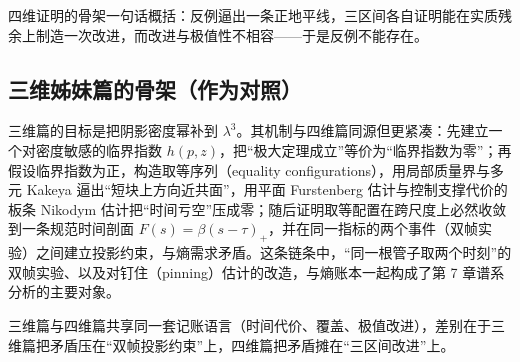 \begin{keybox}[可记忆主句]
四维证明的骨架一句话概括：反例逼出一条正地平线，三区间各自证明能在实质残余上制造一次改进，而改进与极值性不相容——于是反例不能存在。
\end{keybox}

\subsection{三维姊妹篇的骨架（作为对照）}

三维篇的目标是把阴影密度幂补到 $\lambda^{3}$。其机制与四维篇同源但更紧凑：先建立一个对密度敏感的临界指数 $h(p,z)$，把“极大定理成立”等价为“临界指数为零”；再假设临界指数为正，构造取等序列（equality configurations），用局部质量界与多元 Kakeya 逼出“短块上方向近共面”，用平面 Furstenberg 估计与控制支撑代价的板条 Nikodym 估计把“时间亏空”压成零；随后证明取等配置在跨尺度上必然收敛到一条规范时间剖面 $F(s)=\beta(s-\tau)_{+}$，并在同一指标的两个事件（双帧实验）之间建立投影约束，与熵需求矛盾。这条链条中，“同一根管子取两个时刻”的双帧实验、以及对钉住（pinning）估计的改造，与熵账本一起构成了第 7 章谱系分析的主要对象。

\begin{keybox}[可记忆主句]
三维篇与四维篇共享同一套记账语言（时间代价、覆盖、极值改进），差别在于三维篇把矛盾压在“双帧投影约束”上，四维篇把矛盾摊在“三区间改进”上。
\end{keybox}